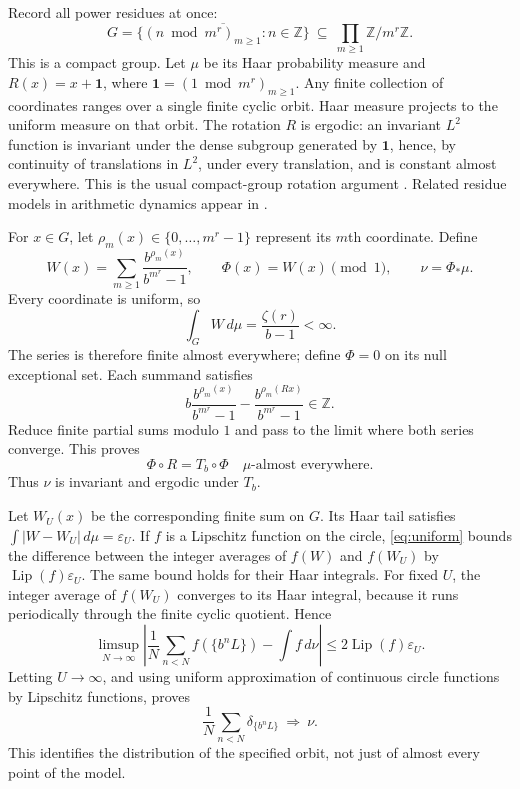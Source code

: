 \documentclass[11pt]{article}
\newcommand{\Z}{\mathbb Z}
\newcommand{\dd}{\,d}
\begin{document}
Record all power residues at once:
\[
G=\overline{\{(n\bmod m^r)_{m\ge1}:n\in\Z\}}
\ \subseteq\ \prod_{m\ge1}\Z/m^r\Z.
\]
This is a compact group. Let $\mu$ be its Haar probability measure and
$R(x)=x+\mathbf1$, where $\mathbf1=(1\bmod m^r)_{m\ge1}$.
Any finite collection of coordinates ranges over a single finite cyclic
orbit. Haar measure projects to the uniform measure on that orbit.
The rotation $R$ is ergodic: an invariant $L^2$ function is invariant
under the dense subgroup generated by $\mathbf1$, hence, by continuity
of translations in $L^2$, under every translation, and is constant
almost everywhere. This is the usual compact-group rotation argument
\cite{MF}. Related residue models in arithmetic dynamics appear in
\cite{CS,CV}.

For $x\in G$, let $\rho_m(x)\in\{0,\ldots,m^r-1\}$ represent its
$m$th coordinate. Define
\[
W(x)=\sum_{m\ge1}\frac{b^{\rho_m(x)}}{b^{m^r}-1},\qquad
\Phi(x)=W(x)\pmod1,\qquad \nu=\Phi_*\mu.
\]
Every coordinate is uniform, so
\[
\int_G W\dd\mu=\frac{\zeta(r)}{b-1}<\infty.
\]
The series is therefore finite almost everywhere; define $\Phi=0$ on
its null exceptional set. Each summand satisfies
\[
b\frac{b^{\rho_m(x)}}{b^{m^r}-1}
-\frac{b^{\rho_m(Rx)}}{b^{m^r}-1}\in\Z.
\]
Reduce finite partial sums modulo $1$ and pass to the limit where both
series converge. This proves
\begin{equation}\label{eq:factor}
\Phi\circ R=T_b\circ\Phi\quad\mu\text{-almost everywhere}.
\end{equation}
Thus $\nu$ is invariant and ergodic under $T_b$.

Let $W_U(x)$ be the corresponding finite sum on $G$. Its Haar tail
satisfies $\int|W-W_U|\dd\mu=\varepsilon_U$.
If $f$ is a Lipschitz function on the circle, \eqref{eq:uniform} bounds
the difference between the integer averages of $f(W)$ and $f(W_U)$ by
$\operatorname{Lip}(f)\varepsilon_U$. The same bound holds for their
Haar integrals. For fixed $U$, the integer average of $f(W_U)$ converges
to its Haar integral, because it runs periodically through the finite
cyclic quotient. Hence
\[
\limsup_{N\to\infty}
\left|\frac1N\sum_{n<N}f(\{b^nL\})-\int f\dd\nu\right|
\le2\operatorname{Lip}(f)\varepsilon_U.
\]
Letting $U\to\infty$, and using uniform approximation of continuous
circle functions by Lipschitz functions, proves
\begin{equation}\label{eq:weak}
\frac1N\sum_{n<N}\delta_{\{b^nL\}}\ \Longrightarrow\ \nu.
\end{equation}
This identifies the distribution of the specified orbit, not just of
almost every point of the model.
\end{document}
